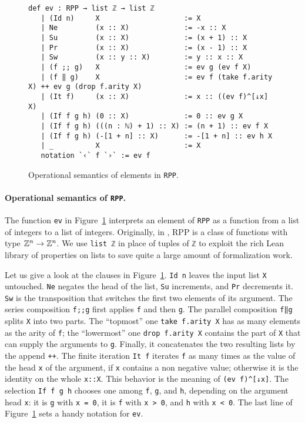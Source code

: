\documentclass[runningheads]{llncs}
\newcommand{\RPP}{\textsf{RPP}\xspace}
\newcommand{\LEAN}{\textsf{Lean}\xspace}
\begin{document}
\begin{figure}
\begin{lstlisting}[basicstyle=\small]
   def ev : RPP → list ℤ → list ℤ
   | (Id n)     X                    := X
   | Ne         (x :: X)             := -x :: X
   | Su         (x :: X)             := (x + 1) :: X
   | Pr         (x :: X)             := (x - 1) :: X
   | Sw         (x :: y :: X)        := y :: x :: X
   | (f ;; g)   X                    := ev g (ev f X)
   | (f ‖ g)    X                    := ev f (take f.arity X) ++ ev g (drop f.arity X)
   | (It f)     (x :: X)             := x :: ((ev f)^[↓x] X)
   | (If f g h) (0 :: X)             := 0 :: ev g X
   | (If f g h) (((n : ℕ) + 1) :: X) := (n + 1) :: ev f X
   | (If f g h) (-[1 + n] :: X)      := -[1 + n] :: ev h X
   | _          X                    := X
   notation `‹` f `›` := ev f
\end{lstlisting}
\caption{Operational semantics of elements in \lstinline|RPP|.}
\label{fig:RPP-ev}
\end{figure}

\paragraph{Operational semantics of {\normalfont \lstinline|RPP|}.}
The function \lstinline|ev| in Figure~\ref{fig:RPP-ev} interprets an element of \lstinline|RPP| as a function from a list of integers to a list of integers. Originally, in \cite{DBLP:journals/tcs/PaoliniPR20}, \RPP is a class of functions with type $ \mathbb{Z}^n \rightarrow \mathbb{Z}^n $. We use \lstinline|list ℤ| in place of tuples of \lstinline|ℤ| to exploit the rich \LEAN library of properties on lists to save quite a large amount of formalization work.

Let us give a look at the clauses in Figure~\ref{fig:RPP-ev}.
\lstinline|Id n| leaves the input list \lstinline|X| untouched.
\lstinline|Ne| negates the head of the list, \lstinline|Su| increments, and \lstinline|Pr| decrements it.
\lstinline|Sw| is the transposition that switches the first two elements of its argument.
The series composition \lstinline|f;;g| first applies \lstinline|f| and then
\lstinline|g|.
The parallel composition \lstinline|f‖g| splits \lstinline|X| into two parts. The ``topmost'' one \lstinline|take f.arity X| has as many elements as the arity of \lstinline|f|; the ``lowermost'' one \lstinline|drop f.arity X| contains the part of \lstinline|X| that can supply the arguments to \lstinline|g|. Finally, it concatenates the two resulting lists by the append \lstinline|++|. The finite iteration
\lstinline|It f| iterates \lstinline|f| as many times as the value of the head \lstinline|x| of the argument, if \lstinline|x| contains a non negative value; otherwise it is the identity on the whole \lstinline|x::X|. This behavior is the meaning of \lstinline|(ev f)^[↓x]|.
The selection \lstinline|If f g h| chooses one among \lstinline|f|, \lstinline|g|, and \lstinline|h|, depending on the argument head \lstinline|x|: it is \lstinline|g| with \lstinline|x = 0|, it is \lstinline|f| with \lstinline|x > 0|, and \lstinline|h| with \lstinline|x < 0|.
The last line of Figure~\ref{fig:RPP-ev} sets a handy notation for \lstinline|ev|.
\end{document}
